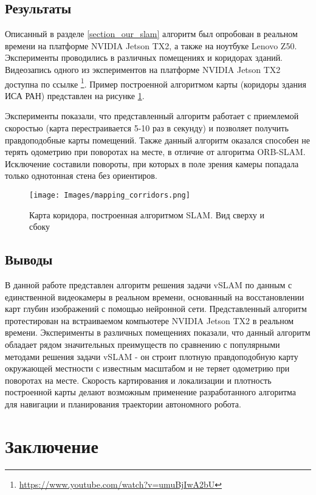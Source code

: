 \documentclass{mipt-thesis-bs}
\begin{document}
\section{Результаты}

Описанный в разделе \ref{section_our_slam} алгоритм был опробован в реальном времени на платформе NVIDIA Jetson TX2, а также на ноутбуке Lenovo Z50. Эксперименты проводились в различных помещениях и коридорах зданий. Видеозапись одного из экспериментов на платформе NVIDIA Jetson TX2 доступна по ссылке \footnote{\href{https://www.youtube.com/watch?v=umuBjIwA2bU&feature=youtu.be}{https://www.youtube.com/watch?v=umuBjIwA2bU}}. Пример построенной алгоритмом карты (коридоры здания ИСА РАН) представлен на рисунке \ref{figuremap}.

Эксперименты показали, что представленный алгоритм работает с приемлемой скоростью (карта перестраивается 5-10 раз в секунду) и позволяет получить правдоподобные карты помещений. Также данный алгоритм оказался способен не терять одометрию при поворотах на месте, в отличие от алгоритма ORB-SLAM. Исключение составили повороты, при которых в поле зрения камеры попадала только однотонная стена без ориентиров.

\begin{figure}
	\centering
	\texttt{[image: Images/mapping\_corridors.png]}
	\caption{Карта коридора, построенная алгоритмом SLAM. Вид сверху и сбоку}
	\label{figuremap}
\end{figure} 

\section{Выводы}

В данной работе представлен алгоритм решения задачи vSLAM по данным с единственной видеокамеры в реальном времени, основанный на восстановлении карт глубин изображений с помощью нейронной сети. Представленный алгоритм протестирован на встраиваемом компьютере NVIDIA Jetson TX2 в реальном времени. Эксперименты в различных помещениях показали, что данный алгоритм обладает рядом значительных преимуществ по сравнению с популярными методами решения задачи vSLAM - он строит плотную правдоподобную карту окружающей местности с известным масштабом и не теряет одометрию при поворотах на месте. Скорость картирования и локализации и плотность построенной карты делают возможным применение разработанного алгоритма для навигации и планирования траектории автономного робота.

\chapter{Заключение}
\end{document}
